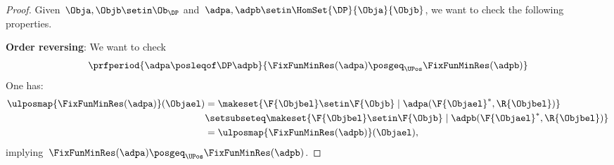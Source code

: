 \begin{proof}
    Given~$\Obja,\Objb \setin \Ob_\DP$ and~$\adpa,\adpb \setin \HomSet{\DP}{\Obja}{\Objb}$, we want to check the following properties.

    \textbf{Order reversing}:
    We want to check
    \begin{equation*}
        \prfperiod{\adpa \posleqof\DP \adpb}{\FixFunMinRes(\adpa) \posgeq_\UPos \FixFunMinRes(\adpb)}
    \end{equation*}
    One has:
    \begin{equation*}
        \begin{aligned}
            \ulposmap{\FixFunMinRes(\adpa)}(\Objael) & =\makeset{\F{\Objbel} \setin \F{\Objb} \mid \adpa(\F{\Objael}^*, \R{\Objbel})} \\
                                                     & \setsubseteq \makeset{\F{\Objbel} \setin \F{\Objb} \mid \adpb(\F{\Objael}^*, \R{\Objbel})} \\
                                                     & = \ulposmap{\FixFunMinRes(\adpb)}(\Objael),
        \end{aligned}
    \end{equation*}
    implying~$\FixFunMinRes(\adpa) \posgeq_\UPos \FixFunMinRes(\adpb)$.


\end{proof}

